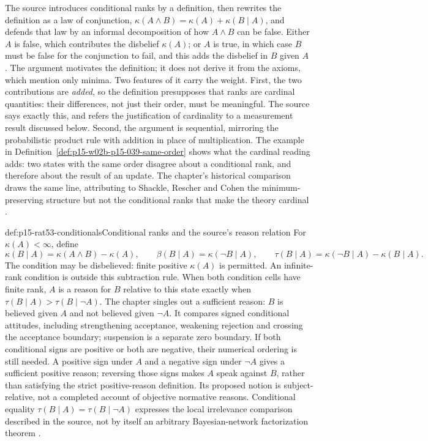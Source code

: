 The source introduces conditional ranks by a definition, then rewrites the
definition as a law of conjunction,
\(\kappa(A\land B)=\kappa(A)+\kappa(B\mid A)\), and defends that law by an
informal decomposition of how \(A\land B\) can be false.  Either \(A\) is
false, which contributes the disbelief \(\kappa(A)\); or \(A\) is true, in
which case \(B\) must be false for the conjunction to fail, and this adds the
disbelief in \(B\) given \(A\)
\parencite[p.~339]{KernIsbernerSkovgaardOlsenSpohn2021Ranking}.
The argument motivates the definition; it does not derive it from the axioms,
which mention only minima.  Two features of it carry the weight.  First, the
two contributions are \emph{added}, so the definition presupposes that ranks
are cardinal quantities: their differences, not just their order, must be
meaningful.  The source says exactly this, and refers the justification of
cardinality to a measurement result discussed below.  Second, the argument
is sequential, mirroring the probabilistic product rule with addition in
place of multiplication.  The example in
Definition~\ref{def:p15-w02b-p15-039-same-order} shows what the cardinal
reading adds: two states with the same order disagree about a conditional
rank, and therefore about the result of an update.  The chapter's historical
comparison draws the same line, attributing to Shackle, Rescher and Cohen the
minimum-preserving structure but not the conditional ranks that make the
theory cardinal
\parencite[pp.~339, 341]{KernIsbernerSkovgaardOlsenSpohn2021Ranking}.

\begin{hbdefinition}{def:p15-rat53-conditionals}{Conditional ranks and the source's reason relation}
For \(\kappa(A)<\infty\), define
\[
 \kappa(B\mid A)=\kappa(A\land B)-\kappa(A),\qquad
 \beta(B\mid A)=\kappa(\neg B\mid A),\qquad
 \tau(B\mid A)=\kappa(\neg B\mid A)-\kappa(B\mid A).
\]
The condition may be disbelieved: finite positive \(\kappa(A)\) is
permitted.  An infinite-rank condition is outside this subtraction rule.
When both condition cells have finite rank, \(A\) is a reason for \(B\)
relative to this state exactly when
\(\tau(B\mid A)>\tau(B\mid\neg A)\).
The chapter singles out a sufficient reason: \(B\) is believed given
\(A\) and not believed given \(\neg A\).  It compares signed conditional
attitudes, including strengthening acceptance, weakening rejection and
crossing the acceptance boundary; suspension is a separate zero boundary.
If both conditional signs are positive or both are negative, their numerical
ordering is still needed.  A positive sign under \(A\) and a negative sign
under \(\neg A\) gives a sufficient positive reason; reversing those signs
makes \(A\) speak against \(B\), rather than satisfying the strict
positive-reason definition.
Its proposed notion is subject-relative, not a completed account of objective
normative reasons.  Conditional equality
\(\tau(B\mid A)=\tau(B\mid\neg A)\) expresses the local irrelevance
comparison described in the source, not by itself an arbitrary Bayesian-network
factorization theorem \parencite[pp.~339--340]{KernIsbernerSkovgaardOlsenSpohn2021Ranking}.
\end{hbdefinition}

